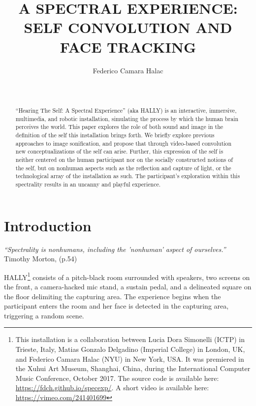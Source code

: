 \documentclass{nime-alternate}
\begin{document}
\title{A SPECTRAL EXPERIENCE: SELF CONVOLUTION AND FACE TRACKING}

\author{Federico Camara Halac\\\\\\}
\newcommand{\ttt}{\raise.17ex\hbox{$\scriptstyle\mathtt{\sim}$}}
\maketitle

\begin{abstract}
 ``Hearing The Self: A Spectral Experience'' (aka HALLY) is an interactive, immersive, multimedia, and robotic installation, simulating the process by which the human brain perceives the world. This paper explores the role of both sound and image in the definition of the self this installation brings forth. We briefly explore previous approaches to image sonification, and propose that through video-based convolution new conceptualizations of the self can arise. Further, this expression of the self is neither centered on the human participant nor on the socially constructed notions of the self, but on nonhuman aspects such as the reflection and capture of light, or the technological array of the installation as such. The participant's exploration within this spectrality results in an uncanny and playful experience.
\end{abstract}

\section{Introduction}
\textit{``Spectrality is nonhumans, including the 'nonhuman' aspect of ourselves.''} Timothy Morton, (p.54) \cite{morton:humankind}
%

HALLY\footnote{This installation is a collaboration between Lucia Dora Simonelli (ICTP) in Trieste, Italy, Matias Gonzalo Delgadino (Imperial College) in London, UK, and Federico Camara Halac (NYU) in New York, USA. It was premiered in the Xuhui Art Museum, Shanghai, China, during the International Computer Music Conference, October 2017. The source code is available here: \url{https://fdch.github.io/specexp/}. A short video is available here: \url{https://vimeo.com/241401699}} consists of a pitch-black room surrounded with speakers, two screens on the front, a camera-hacked mic stand, a sustain pedal, and a delineated square on the floor delimiting the capturing area. The experience begins when the participant enters the room and her face is detected in the capturing area, triggering a random scene. 
\end{document}
